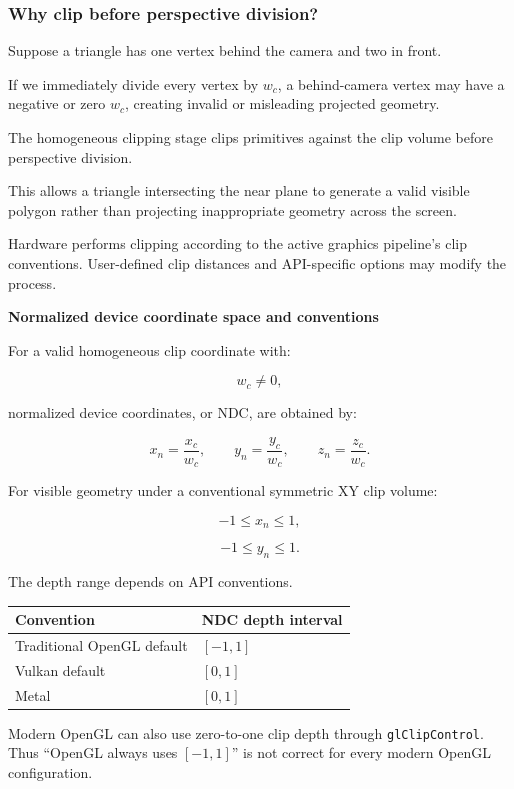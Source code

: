 \subsubsection{Why clip before perspective division?}\label{02-foundations-ii-ch032-why-clip-before-perspective-division}

Suppose a triangle has one vertex behind the camera and two in front.

If we immediately divide every vertex by \(w_c\), a behind-camera vertex may have a negative or zero \(w_c\), creating invalid or misleading projected geometry.

The homogeneous clipping stage clips primitives against the clip volume before perspective division.

This allows a triangle intersecting the near plane to generate a valid visible polygon rather than projecting inappropriate geometry across the screen.

Hardware performs clipping according to the active graphics pipeline's clip conventions. User-defined clip distances and API-specific options may modify the process.

\textbf{Normalized device coordinate space and conventions}

For a valid homogeneous clip coordinate with:

\[
 w_c\ne0,
\]

normalized device coordinates, or NDC, are obtained by:

\[
 \boxed{ x_n=\frac{x_c}{w_c}, \qquad y_n=\frac{y_c}{w_c}, \qquad z_n=\frac{z_c}{w_c} }.
\]

For visible geometry under a conventional symmetric XY clip volume:

\[
 -1\le x_n\le1,
\]

\[
 -1\le y_n\le1.
\]

The depth range depends on API conventions.

{\def\LTcaptype{none} %
\begin{longtable}[]{@{}ll@{}}
\toprule\noalign{}
Convention & NDC depth interval \\
\midrule\noalign{}
\endhead
\bottomrule\noalign{}
\endlastfoot
Traditional OpenGL default & \([-1,1]\) \\
Vulkan default & \([0,1]\) \\
Metal & \([0,1]\) \\
\end{longtable}
}

Modern OpenGL can also use zero-to-one clip depth through \texttt{glClipControl}. Thus ``OpenGL always uses \([-1,1]\)'' is not correct for every modern OpenGL configuration. 

